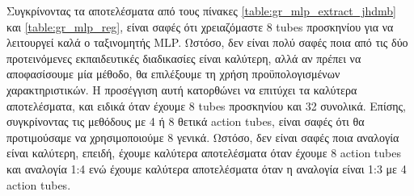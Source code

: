 Συγκρίνοντας τα αποτελέσματα από τους πίνακες \ref{table:gr_mlp_extract_jhdmb}  και \ref{table:gr_mlp_reg}, είναι σαφές ότι χρειαζόμαστε 8
\en tubes \gr προσκηνίου για να λειτουργεί καλά ο ταξινομητής \en MLP. \gr  Ωστόσο, δεν είναι πολύ σαφές ποια από
τις  δύο προτεινόμενες εκπαιδευτικές διαδικασίες είναι καλύτερη, αλλά αν πρέπει να αποφασίσουμε μία
μέθοδο, θα επιλέξουμε τη χρήση προϋπολογισμένων χαρακτηριστικών. Η προσέγγιση αυτή
κατορθώνει να επιτύχει τα καλύτερα αποτελέσματα, και ειδικά όταν έχουμε 8
\en tubes \gr προσκηνίου και 32 συνολικά. Επίσης, συγκρίνοντας τις μεθόδους με 4 ή 8 θετικά
\en action tubes\gr, είναι σαφές ότι θα προτιμούσαμε να χρησιμοποιούμε 8 γενικά. Ωστόσο, δεν είναι
σαφές ποια αναλογία είναι καλύτερη, επειδή, έχουμε καλύτερα αποτελέσματα όταν έχουμε 8
\en action tubes \gr και αναλογία 1:4 ενώ έχουμε καλύτερα αποτελέσματα όταν η αναλογία είναι 1:3
με 4 \en action tubes.\gr


% 